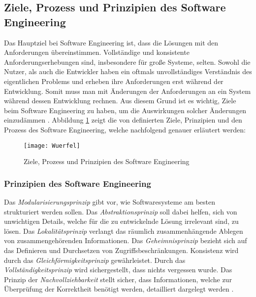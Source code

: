 \subsection{Ziele, Prozess und Prinzipien des Software Engineering}

Das Hauptziel bei Software Engineering ist, dass die Lösungen mit den Anforderungen übereinstimmen. Vollständige und konsistente Anforderungserhebungen sind, insbesondere für große Systeme, selten. Sowohl die Nutzer, als auch die Entwickler haben ein oftmals unvollständiges Verständnis des eigentlichen Problems und erheben ihre Anforderungen erst während der Entwicklung. Somit muss man mit Änderungen der Anforderungen an ein System während dessen Entwicklung rechnen. Aus diesem Grund ist es wichtig, Ziele beim Software Engineering zu haben, um die Auswirkungen solcher Änderungen einzudämmen \cite{Booch1993}.
Abbildung  \ref{fig:Wuerfel} zeigt die von \cite{ross1975software} definierten Ziele, Prinzipien und den Prozess des Software Engineering, welche nachfolgend genauer erläutert werden: 

\begin{figure}[htp]
\begin{center}
  \texttt{[image: Wuerfel]} %
  \caption{Ziele, Prozess und Prinzipien des Software Engineering  \cite{ross1975software}}
  \label{fig:Wuerfel}
\end{center}
\end{figure}

\subsubsection{Prinzipien des Software Engineering}


 Das \textit{Modularisierungsprinzip} gibt vor, wie Softwaresysteme am besten strukturiert werden sollen. Das \textit{Abstraktionsprinzip} soll dabei helfen, sich von unwichtigen Details, welche für die zu entwickelnde Lösung irrelevant sind, zu lösen. Das \textit{Lokalitätsprinzip} verlangt das räumlich zusammenhängende Ablegen von zusammengehörenden Informationen. Das \textit{Geheimnisprinzip} bezieht sich auf das Definieren und Durchsetzen von Zugriffsbeschränkungen. Konsistenz wird durch das \textit{Gleichförmigkeitsprinzip} gewährleistet. Durch das \textit{Vollständigkeitsprinzip} wird sichergestellt, dass nichts vergessen wurde. Das Prinzip der \textit{Nachvollziehbarkeit} stellt sicher, dass Informationen, welche zur Überprüfung der Korrektheit benötigt werden, detailliert dargelegt werden \cite{ross1975software}.
 
